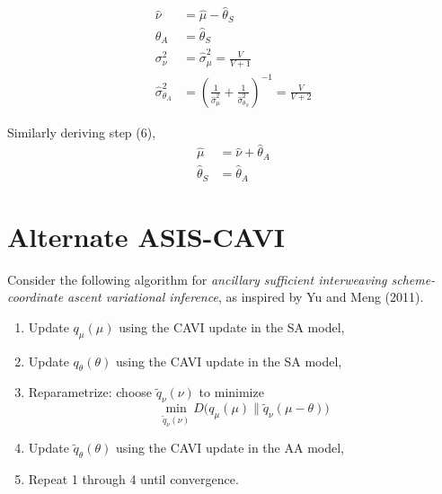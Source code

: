 \documentclass{article}
\begin{document}
\begin{align}
\widehat\nu 
&= \widehat\mu - \widehat\theta_S \\
\widehat\theta_A
&= \widehat\theta_S \\
\sigma_{\nu}^2&=\widehat\sigma_{\mu}^2 
= \frac{V}{V+1}\\
\widehat\sigma_{\theta_A}^2 
&= \left(\frac{1}{\widehat\sigma_{\mu}^2} + \frac{1}{\widehat\sigma_{\theta_S}^2}\right)^{-1}
= \frac{V}{V+2}
\end{align}

Similarly deriving step (6),
\begin{align}
\widehat\mu 
&= \widehat\nu + \widehat\theta_A \\
\widehat\theta_S
&= \widehat\theta_A 
\end{align}


\newpage



\section{Alternate ASIS-CAVI}

Consider the following algorithm for {\sl ancillary sufficient interweaving scheme-coordinate ascent variational inference}, as inspired by Yu and Meng (2011).
\begin{enumerate}
\item Update $q_\mu(\mu)$ using the CAVI update in the SA model,
\item Update $q_\theta(\theta)$ using the CAVI update in the SA model,
\item Reparametrize: choose $\widetilde q_\nu(\nu)$ to minimize
$$
\min_{\widetilde q_\nu(\nu)} D\bigg(q_\mu(\mu)\bigg\|\widetilde q_\nu(\mu-\theta)\bigg)
$$
\item Update $\widetilde q_\theta(\theta)$ using the CAVI update in the AA model,
\item Repeat 1 through 4 until convergence.
\end{enumerate}
\end{document}

